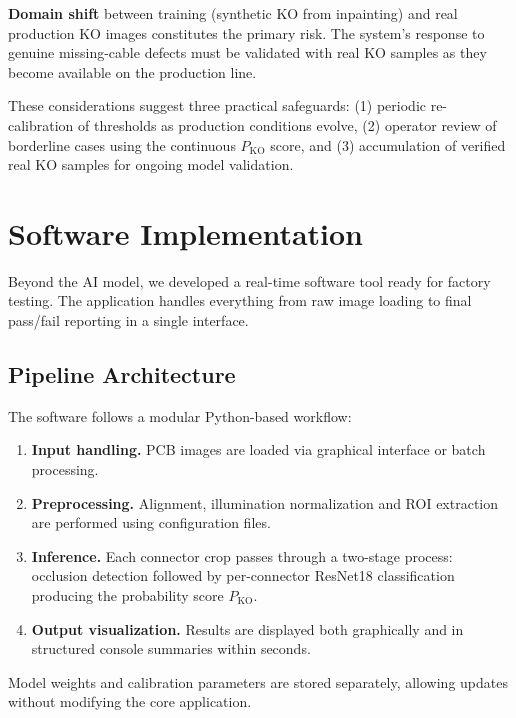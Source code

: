 \documentclass[11pt,a4paper]{article}
\begin{document}
\textbf{Domain shift} between training (synthetic KO from inpainting) and real production KO images constitutes the primary risk. The system's response to genuine missing-cable defects must be validated with real KO samples as they become available on the production line.

These considerations suggest three practical safeguards: (1) periodic re-calibration of thresholds as production conditions evolve, (2) operator review of borderline cases using the continuous $P_{\mathrm{KO}}$ score, and (3) accumulation of verified real KO samples for ongoing model validation.


\section{Software Implementation}

Beyond the AI model, we developed a real-time software tool ready for factory testing. The application handles everything from raw image loading to final pass/fail reporting in a single interface.

\subsection{Pipeline Architecture}
The software follows a modular Python-based workflow:

\begin{enumerate}[nosep]
    \item \textbf{Input handling.} PCB images are loaded via graphical interface or batch processing.
    \item \textbf{Preprocessing.} Alignment, illumination normalization and ROI extraction are performed using configuration files.
    \item \textbf{Inference.} Each connector crop passes through a two-stage process: occlusion detection followed by per-connector ResNet18 classification producing the probability score \(P_{\mathrm{KO}}\).
    \item \textbf{Output visualization.} Results are displayed both graphically and in structured console summaries within seconds.
\end{enumerate}

Model weights and calibration parameters are stored separately, allowing updates without modifying the core application.
\end{document}
